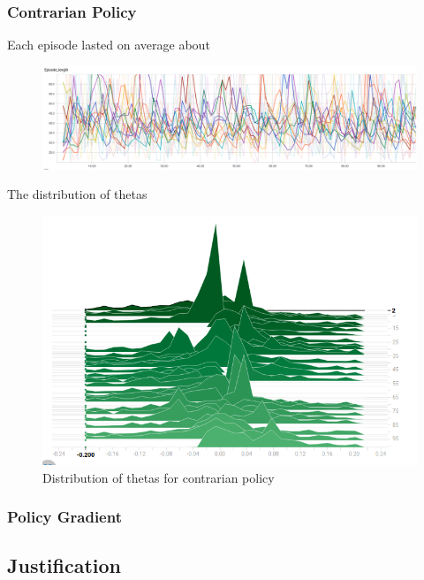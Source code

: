 \documentclass[12pt,a4paper]{article}
\begin{document}
\subsubsection*{Contrarian Policy}

Each episode lasted on average about 
\begin{figure}[htbp]
\begin{center}
\includegraphics[width=\linewidth]{contrarian_lengths.png}
\caption{}
\label{contrarian_lengths}
\end{center}
\end{figure}

The distribution of thetas 

\begin{figure}[htbp]
\begin{center}
\includegraphics[width=\linewidth]{contrarian_thetas.png}
\caption{Distribution of thetas for contrarian policy}
\label{contrarian_thetas}
\end{center}
\end{figure}

\subsubsection*{Policy Gradient}

\subsection*{Justification}
\end{document}

